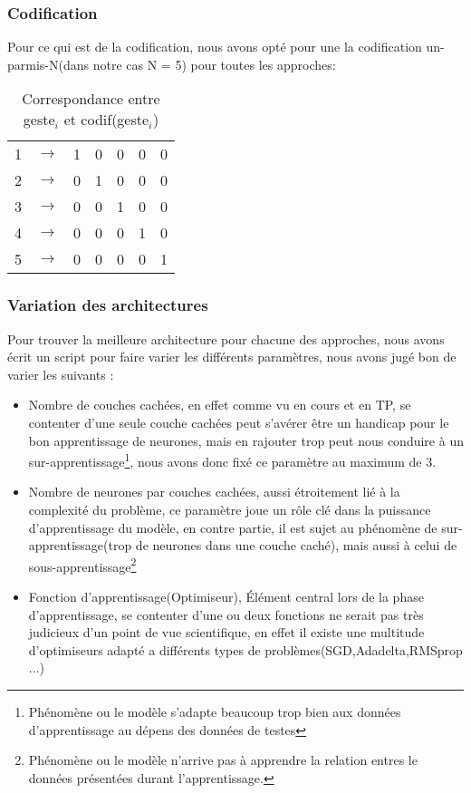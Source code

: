\subsubsection{Codification}
Pour ce qui est de la codification, nous avons opté pour une la codification un-parmis-N(dans notre cas N = 5) pour toutes les approches:\\
\begin{table}[H]
	\centering
	\begin{tabular}{|c|l|c|c|c|c|c|}
		\cline{1-1} \cline{3-7}
		1 & $\rightarrow$ & 1 & 0 & 0 & 0 & 0 \\ \cline{1-1} \cline{3-7} 
		2 & $\rightarrow$ & 0 & 1 & 0 & 0 & 0 \\ \cline{1-1} \cline{3-7} 
		3 & $\rightarrow$ & 0 & 0 & 1 & 0 & 0 \\ \cline{1-1} \cline{3-7} 
		4 & $\rightarrow$ & 0 & 0 & 0 & 1 & 0 \\ \cline{1-1} \cline{3-7} 
		5 & $\rightarrow$ & 0 & 0 & 0 & 0 & 1 \\ \cline{1-1} \cline{3-7} 
	\end{tabular}
	\caption{Correspondance entre geste$_i$ et codif(geste$_i$)}
	
\end{table}


\subsubsection{Variation des architectures}
Pour trouver la meilleure architecture pour chacune des approches, nous avons écrit un script pour faire varier les différents paramètres, nous avons jugé bon de varier les suivants : 
\newpage
\begin{itemize}
	\item Nombre de couches cachées, en effet comme vu en cours et en TP, se contenter d'une seule couche cachées peut s'avérer être un handicap pour le bon apprentissage de neurones, mais en rajouter trop peut nous conduire à un sur-apprentissage\footnote{Phénomène ou le modèle s'adapte beaucoup trop bien aux données d'apprentissage au dépens des données de testes}, nous avons donc fixé ce paramètre au maximum de 3.
	
	\item Nombre de neurones par couches cachées, aussi étroitement lié à la complexité du problème, ce paramètre joue un rôle clé dans la puissance d'apprentissage du modèle, en contre partie, il est sujet au phénomène de sur-apprentissage(trop de neurones dans une couche caché), mais aussi à celui de sous-apprentissage\footnote{Phénomène ou le modèle n'arrive pas à apprendre la relation entres le données présentées durant l'apprentissage.}
	
	\item Fonction d'apprentissage(Optimiseur), Élément central lors de la phase d'apprentissage, se contenter d'une ou deux fonctions ne serait pas très judicieux d'un point de vue scientifique, en effet il existe une multitude d'optimiseurs adapté a différents types de problèmes(SGD\cite{Bottou2010},Adadelta\cite{adapt},RMSprop\cite{rms} ...)
\end{itemize}


